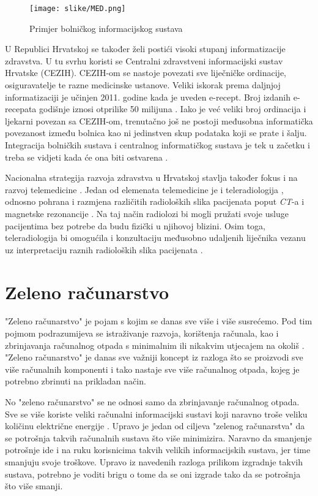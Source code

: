 \documentclass[times, utf8, zavrsni, numeric, sort]{fer}
\begin{document}
\begin{figure}[htb]
\centering
\texttt{[image: slike/MED.png]}
\caption{Primjer bolničkog informacijskog sustava}
\label{fig:med}
\end{figure}

U Republici Hrvatskoj se također želi postići visoki stupanj informatizacije zdravstva. U tu svrhu koristi se Centralni zdravstveni informacijski sustav Hrvatske (CEZIH). CEZIH-om se nastoje povezati sve liječničke ordinacije, osiguravatelje te razne medicinske ustanove. Veliki iskorak prema daljnjoj informatizaciji je učinjen 2011. godine kada je uveden e-recept. Broj izdanih e-recepata godišnje iznosi otprilike 50 milijuna \cite{strategija}. Iako je već veliki broj ordinacija i ljekarni povezan sa CEZIH-om, trenutačno još ne postoji međusobna informatička povezanost između bolnica kao ni jedinstven skup podataka koji se prate i šalju. Integracija bolničkih sustava i centralnog informatičkog sustava je tek u začetku i treba se vidjeti kada će ona biti ostvarena \cite{strategija}.

Nacionalna strategija razvoja zdravstva u Hrvatskoj stavlja također fokus i na razvoj telemedicine  \cite{strategija}. Jedan od elemenata telemedicine je i teleradiologija , odnosno pohrana i razmjena različitih radioloških slika pacijenata poput \emph{CT}-a i magnetske rezonancije \cite{Barneveld:10}. Na taj način radiolozi bi mogli pružati svoje usluge pacijentima bez potrebe da budu fizički u njihovoj blizini. Osim toga, teleradiologija bi omogućila i konzultaciju međusobno udaljenih liječnika vezanu uz interpretaciju raznih radioloških slika pacijenata \cite{Ross:09}.

\section{Zeleno računarstvo}

"Zeleno računarstvo"  je pojam s kojim se danas sve više i više susrećemo. Pod tim pojmom podrazumijeva se istraživanje razvoja, korištenja računala, kao i zbrinjavanja  računalnog otpada s minimalnim ili nikakvim utjecajem na okoliš \cite{San:08}. "Zeleno računarstvo" je danas sve važniji koncept iz razloga što se proizvodi sve više računalnih komponenti i tako nastaje sve više računalnog otpada, kojeg je potrebno zbrinuti na prikladan način.

No "zeleno računarstvo" se ne odnosi samo da zbrinjavanje računalnog otpada. Sve se više koriste veliki računalni informacijski sustavi koji naravno troše veliku količinu električne energije \cite{Zhang:10, Liu:09}. Upravo je jedan od ciljeva "zelenog računarstva" da se potrošnja takvih računalnih sustava što više minimizira. Naravno da smanjenje potrošnje ide i na ruku korisnicima takvih velikih informacijskih sustava, jer time smanjuju svoje troškove. Upravo iz navedenih razloga prilikom izgradnje takvih sustava, potrebno je voditi brigu o tome da se oni izgrade tako da se potrošnja što više smanji.
\end{document}
